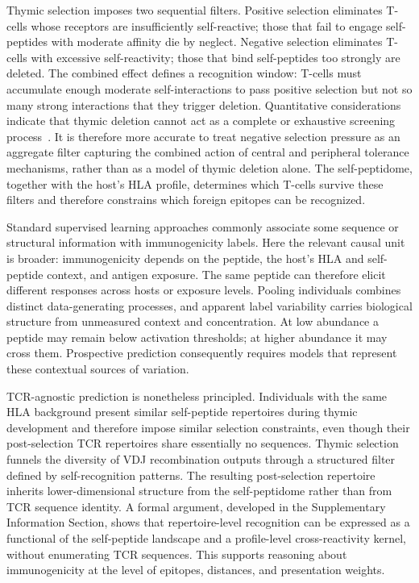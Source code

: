 \documentclass[11pt]{article}
\begin{document}
Thymic selection imposes two sequential filters.
Positive selection eliminates T-cells whose receptors are
insufficiently self-reactive; those that fail to engage self-peptides
with moderate affinity die by neglect.
Negative selection eliminates T-cells with excessive self-reactivity;
those that bind self-peptides too strongly are deleted.
The combined effect defines a recognition window: T-cells must
accumulate enough moderate self-interactions to pass positive selection
but not so many strong interactions that they trigger deletion.
Quantitative considerations indicate that thymic deletion cannot act
as a complete or exhaustive screening
process~\citep{MoraWalczak2023}.
It is therefore more accurate to treat negative selection pressure as an aggregate filter capturing the combined action of central and peripheral tolerance mechanisms, rather than as a model of thymic deletion alone.
The self-peptidome, together with the host's HLA profile, determines
which T-cells survive these filters and therefore constrains which
foreign epitopes can be recognized.

Standard supervised learning approaches commonly associate some sequence or structural information 
with immunogenicity labels. Here the relevant causal unit is broader:
immunogenicity depends on the peptide, the host's HLA and self-peptide context,
and antigen exposure. The same peptide can therefore elicit different responses
across hosts or exposure levels. Pooling individuals combines distinct
data-generating processes, and apparent label variability carries biological
structure from unmeasured context and concentration. At low abundance a peptide
may remain below activation thresholds; at higher abundance it may cross them.
Prospective prediction consequently requires models that represent these
contextual sources of variation.

TCR-agnostic prediction is nonetheless principled.
Individuals with the same HLA background present similar
self-peptide repertoires during thymic development and therefore impose
similar selection constraints, even though their post-selection TCR
repertoires share essentially no sequences.
Thymic selection funnels the diversity of VDJ recombination outputs
through a structured filter defined by self-recognition patterns.
The resulting post-selection repertoire inherits lower-dimensional
structure from the self-peptidome rather than from TCR sequence
identity.
A formal argument, developed in the Supplementary Information
Section, shows that repertoire-level
recognition can be expressed as a functional of the self-peptide
landscape and a profile-level cross-reactivity kernel, without
enumerating TCR sequences.
This supports reasoning about immunogenicity at the level of
epitopes, distances, and presentation weights.
\end{document}
